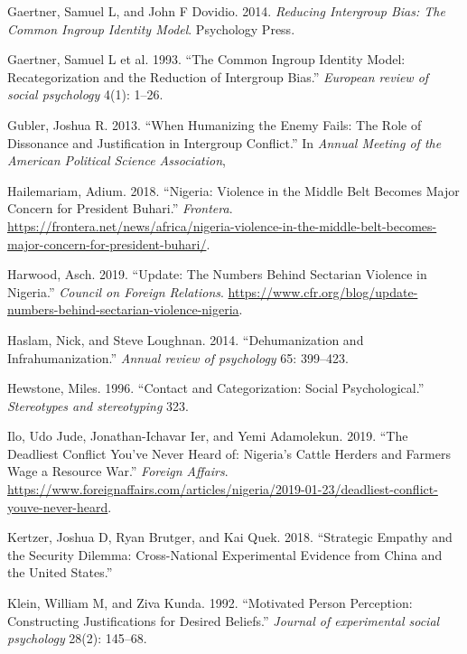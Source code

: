 \documentclass[11pt]{article}
\begin{document}
\leavevmode\hypertarget{ref-gaertner2014reducing}{}%
Gaertner, Samuel L, and John F Dovidio. 2014. \emph{Reducing Intergroup
Bias: The Common Ingroup Identity Model}. Psychology Press.

\leavevmode\hypertarget{ref-gaertner1993common}{}%
Gaertner, Samuel L et al. 1993. ``The Common Ingroup Identity Model:
Recategorization and the Reduction of Intergroup Bias.'' \emph{European
review of social psychology} 4(1): 1--26.

\leavevmode\hypertarget{ref-gubler2013humanizing}{}%
Gubler, Joshua R. 2013. ``When Humanizing the Enemy Fails: The Role of
Dissonance and Justification in Intergroup Conflict.'' In \emph{Annual
Meeting of the American Political Science Association},

\leavevmode\hypertarget{ref-frontera2018nigeria}{}%
Hailemariam, Adium. 2018. ``Nigeria: Violence in the Middle Belt Becomes
Major Concern for President Buhari.'' \emph{Frontera}.
\url{https://frontera.net/news/africa/nigeria-violence-in-the-middle-belt-becomes-major-concern-for-president-buhari/}.

\leavevmode\hypertarget{ref-council2019nigeria}{}%
Harwood, Asch. 2019. ``Update: The Numbers Behind Sectarian Violence in
Nigeria.'' \emph{Council on Foreign Relations}.
\url{https://www.cfr.org/blog/update-numbers-behind-sectarian-violence-nigeria}.

\leavevmode\hypertarget{ref-haslam2014dehumanization}{}%
Haslam, Nick, and Steve Loughnan. 2014. ``Dehumanization and
Infrahumanization.'' \emph{Annual review of psychology} 65: 399--423.

\leavevmode\hypertarget{ref-hewstone1996contact}{}%
Hewstone, Miles. 1996. ``Contact and Categorization: Social
Psychological.'' \emph{Stereotypes and stereotyping} 323.

\leavevmode\hypertarget{ref-fa2019deadly}{}%
Ilo, Udo Jude, Jonathan-Ichavar Ier, and Yemi Adamolekun. 2019. ``The
Deadliest Conflict You've Never Heard of: Nigeria's Cattle Herders and
Farmers Wage a Resource War.'' \emph{Foreign Affairs}.
\url{https://www.foreignaffairs.com/articles/nigeria/2019-01-23/deadliest-conflict-youve-never-heard}.

\leavevmode\hypertarget{ref-kertzer2018empathy}{}%
Kertzer, Joshua D, Ryan Brutger, and Kai Quek. 2018. ``Strategic Empathy
and the Security Dilemma: Cross-National Experimental Evidence from
China and the United States.''

\leavevmode\hypertarget{ref-klein1992motivated}{}%
Klein, William M, and Ziva Kunda. 1992. ``Motivated Person Perception:
Constructing Justifications for Desired Beliefs.'' \emph{Journal of
experimental social psychology} 28(2): 145--68.
\end{document}
